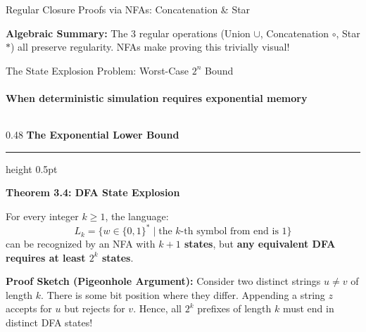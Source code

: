 \documentclass[aspectratio=169, 10pt]{beamer}
\newcommand{\colheader}[1]{%
  {\noindent\footnotesize\bfseries\color{gimpanavy}#1}%
  \vspace{0.02cm}%
  {\color{gimpanavy!30}\hrule height 0.5pt}%
  \vspace{0.05cm}%
}
\newcommand{\cardtitle}[1]{{\noindent\footnotesize\bfseries\color{gimpanavy}#1}\par\vspace{0.03cm}}
\begin{document}
\begin{frame}{Regular Closure Proofs via NFAs: Concatenation \& Star}
  \vspace{0.02cm}
  \begin{tcolorbox}[spotlightcard]
    {\scriptsize\textbf{Algebraic Summary:} The 3 regular operations (Union $\cup$, Concatenation $\circ$, Star $*$) all preserve regularity. NFAs make proving this trivially visual!}
  \end{tcolorbox}
\end{frame}

\begin{frame}{The State Explosion Problem: Worst-Case $2^n$ Bound}
  \framesubtitle{When deterministic simulation requires exponential memory}
  
  \begin{columns}[T]
    \begin{column}{0.48\textwidth}
      \colheader{The Exponential Lower Bound}
      \begin{tcolorbox}[conceptcard]
        \cardtitle{Theorem 3.4: DFA State Explosion}
        {\scriptsize
        For every integer $k \ge 1$, the language:
        \[ L_k = \{w \in \{0, 1\}^* \mid \text{the } k\text{-th symbol from end is } 1\} \]
        can be recognized by an NFA with \textbf{$k+1$ states}, but \textbf{any equivalent DFA requires at least $2^k$ states}.
        \vspace{0.04cm}
        
        \textbf{Proof Sketch (Pigeonhole Argument):}
        Consider two distinct strings $u \ne v$ of length $k$. There is some bit position where they differ. Appending a string $z$ accepts for $u$ but rejects for $v$. Hence, all $2^k$ prefixes of length $k$ must end in distinct DFA states!
        }
      \end{tcolorbox}
    \end{column}
    

\end{columns}
\end{frame}
\end{document}
